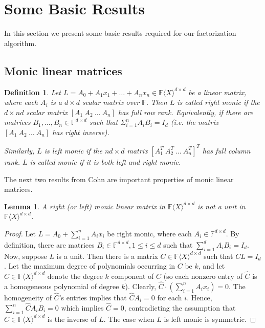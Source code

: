 \documentclass[10pt,a4paper]{article}
\newtheorem{definition}[theorem]{Definition}
\newtheorem{lemma}[theorem]{Lemma}
\newcommand{\F}{\mathbb{F}}
\renewcommand{\angle}[1]{\langle #1 \rangle}
\newcommand{\FX}{\F\angle{X}}
\newcommand{\fR}{\FX}
\begin{document}
\section{Some Basic Results}\label{bas-res-sec}

In this section we present some basic results required for our
factorization algorithm.


%

\subsection*{Monic linear matrices}

\begin{definition}\label{def-monic}{\rm\cite{Cohnfir}}
Let $L=A_0+A_1x_1+ \ldots + A_nx_n\in\fR^{d\times d}$ be a linear
matrix, where each $A_i$ is a $d\times d$ scalar matrix over
$\F$. Then $L$ is called \emph{right monic} if the $d\times nd$ scalar
matrix $[A_1~A_2~\ldots~A_n]$ has full row rank. Equivalently, if
there are matrices $B_1, \ldots, B_n \in \mathbb{F}^{d \times d}$ such
that $\Sigma_{i=1}^n A_iB_i = I_d$ (i.e. the matrix
$[A_1~A_2~\ldots~A_n]$ has right inverse).

Similarly, $L$ is \emph{left monic} if the $nd\times d$ matrix $[A_1^T~A_2^T~\ldots~A_n^T]^T$ 
has full column rank. $L$ is called \emph{monic} if it is
both left and right monic.

%
%
%
%
%
%
%
%
\end{definition}

The next two results from Cohn \cite{Cohnfir} are important properties
of monic linear matrices.

\begin{lemma}\label{monic-nonunit}{\rm\cite{Cohnfir}}
A right (or left) monic linear matrix in $\fR^{d\times d}$ is not a unit in
$\fR^{d\times d}$.
\end{lemma}

\begin{proof}
Let $L=A_0 + \sum_{i=1}^n A_i x_i$ be right monic, where each $A_i\in
\F^{d\times d}$. By definition, there are matrices $B_i\in\F^{d\times
  d}, 1\le i\le d$ such that $\sum_{i=1}^d A_iB_i=I_d$. Now, suppose
$L$ is a unit. Then there is a matrix $C\in\fR^{d\times d}$ such that
$CL=I_d$. Let the maximum degree of polynomials occurring in $C$ be
$k$, and let $\hat{C}\in\fR^{d\times d}$ denote the degree $k$
component of $C$ (so each nonzero entry of $\hat{C}$ is a homogeneous
polynomial of degree $k$). Clearly, $\hat{C}\cdot (\sum_{i=1}^n A_i
x_i)=0$. The homogeneity of $\hat{C}$'s entries implies that $\hat{C}
A_i=0$ for each $i$. Hence, $\sum_{i=1}^n \hat{C}A_i B_i =0$ which
implies $\hat{C}=0$, contradicting the assumption that
$C\in\fR^{d\times d}$ is the inverse of $L$. The case when $L$ is left
monic is symmetric.
\end{proof}
\end{document}
